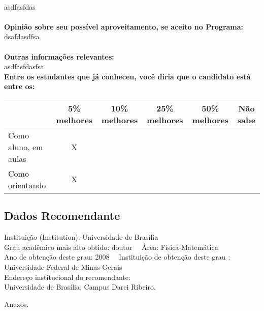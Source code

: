 \documentclass[11pt]{article}
\begin{document}
\\asdfasfdas\\
\\
\textbf{Opinião sobre seu possível aproveitamento, se aceito no Programa:}
\\dsafdasdfsa\\ 
\\
\textbf{Outras informações relevantes:} \\asdfasfdasfsa
\\[0.3cm]
\textbf{Entre os estudantes que já conheceu, você diria que o candidato está entre os:}
\\
\begin{tabular}{|l|c|c|c|c|c|}
\hline
 & 5\% melhores & 10\% melhores & 25\% melhores & 50\% melhores & Não sabe \\
\hline
Como aluno, em aulas & X &  &  &  & \\
\hline
Como orientando & X &  &  &  & \\
\hline
\end{tabular}
\subsection*{Dados Recomendante} 
	Instituição (Institution): Universidade de Brasília
\\ 
	Grau acadêmico mais alto obtido: doutor
	\ \ Área: Física-Matemática
	\\
	Ano de obtenção deste grau: 2008
	\ \ 
	Instituição de obtenção deste grau : Universidade Federal de Minas Gerais
	\\ 
	Endereço institucional do recomendante: \\ Universidade de Brasília, Campus Darci Ribeiro. 
\begin{center}
Anexos.
\end{center}
\end{document}
